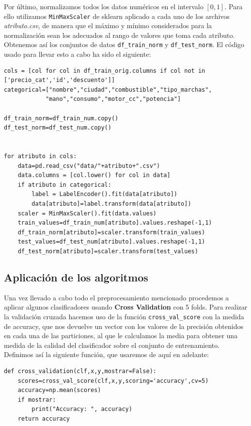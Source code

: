 \documentclass[a4paper,11pt]{article}
\begin{document}
Por último, normalizamos todos los datos numéricos en el intervalo $[0,1]$. Para ello utilizamos \texttt{MinMaxScaler} de sklearn aplicado a cada uno de los archivos \textit{atributo.csv}, de manera que el máximo y mínimo considerados para la normalización sean los adecuados al rango de valores que toma cada atributo. Obtenemos así los conjuntos de datos \texttt{df_train_norm} y \texttt{df_test_norm}. El código usado para llevar esto a cabo ha sido el siguiente: 
\begin{verbatim}
cols = [col for col in df_train_orig.columns if col not in ['precio_cat','id','descuento']]  
categorical=["nombre","ciudad","combustible","tipo_marchas",
			"mano","consumo","motor_cc","potencia"]

df_train_norm=df_train_num.copy()
df_test_norm=df_test_num.copy()


for atributo in cols:
	data=pd.read_csv("data/"+atributo+".csv")
	data.columns = [col.lower() for col in data]
	if atributo in categorical:
		label = LabelEncoder().fit(data[atributo])
		data[atributo]=label.transform(data[atributo])
	scaler = MinMaxScaler().fit(data.values)
	train_values=df_train_num[atributo].values.reshape(-1,1)
	df_train_norm[atributo]=scaler.transform(train_values)
	test_values=df_test_num[atributo].values.reshape(-1,1)
	df_test_norm[atributo]=scaler.transform(test_values)
\end{verbatim}

\subsection{Aplicación de los algoritmos}

Una vez llevado a cabo todo el preprocesamiento mencionado procedemos a aplicar algunos clasificadores usando \textbf{Cross Validation} con 5 folds. Para realizar la validación cruzada hacemos uso de la función \texttt{cross_val_score} con la medida de accuracy, que nos devuelve un vector con los valores de la precisión obtenidos en cada una de las particiones, al que le calculamos la media para obtener una medida de la calidad del clasificador sobre el conjunto de entrenamiento. Definimos así la siguiente función, que usaremos de aquí en adelante: 
\begin{verbatim}
def cross_validation(clf,x,y,mostrar=False):
	scores=cross_val_score(clf,x,y,scoring='accuracy',cv=5)
	accuracy=np.mean(scores)  
	if mostrar:
		print("Accuracy: ", accuracy)
	return accuracy
\end{verbatim}
\end{document}
